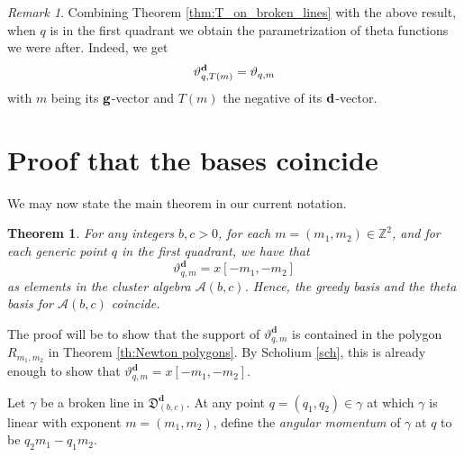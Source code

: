 \documentclass[11pt]{amsart}
\newcommand{\saySS}[1]{\say[SS]{#1}}
\newcommand{\sayMG}[1]{\say[MG]{#1}}
\newtheorem{thm}[theorem]{Theorem}
\theoremstyle{remark}
\newtheorem{remark}[theorem]{Remark}
\numberwithin{equation}{section}
\newcommand{\bfd}{{\bf d}}
\newcommand{\bfg}{{\bf g}}
\begin{document}

\begin{remark}
  Combining Theorem \ref{thm:T_on_broken_lines} with the above result, when $q$
  is in the first quadrant we obtain the parametrization of
  theta functions we were after. Indeed, we get 
  \[
    \vartheta^\bfd_{q,T(m)}=\vartheta_{q,m}
  \]
  with $m$ being its $\bfg$-vector and $T(m)$ the negative of its 
  $\bfd$-vector.
\end{remark}

\section{Proof that the bases coincide}

We may now state the main theorem in our current notation.

\begin{thm}\label{thm: main}
For any integers $b,c>0$, for each $m=(m_1,m_2)\in \mathbb{Z}^2$, and for each
generic point $q$ in the first quadrant, we have that 
\[ \vartheta_{q,m}^{\mathbf{d}} = x[-m_1,-m_2]\]
as elements in the cluster algebra $\mathcal{A}(b,c)$.  Hence, the greedy basis and the theta basis for $\mathcal{A}(b,c)$ coincide.
\end{thm}

\noindent The proof will be to show that the support of $\vartheta_{q,m}^{\mathbf{d}}$ is contained in the polygon $R_{m_1,m_2}$ in Theorem \ref{th:Newton polygons}.  By Scholium \ref{sch}, this is already enough to show that $\vartheta_{q,m}^\mathbf{d}=x[-m_1,-m_2]$.

Let $\gamma$ be a broken line in $\mathfrak{D}_{(b,c)}^\mathbf{d}$.  At any point $q=(q_1,q_2)\in \gamma$ at which $\gamma$ is linear with exponent $m=(m_1,m_2)$, define the \emph{angular momentum} of $\gamma$ at $q$ to be $q_2m_1-q_1m_2$.
\end{document}
